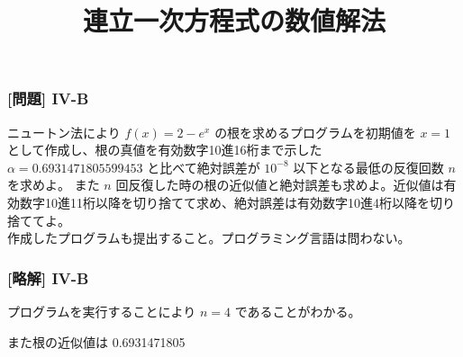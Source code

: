 \documentclass[dvipdfmx,aspectratio=169,20pt]{beamer}
\newcommand{\myfontsetting}[3]{{\fontsize{#1}{#2}\selectfont #3}}
\begin{document}
\begin{frame}
\frametitle{[問題] I\hspace{-.1em}V-B}
\myfontsetting{16pt}{18pt}{
ニュートン法により
}
\myfontsetting{14pt}{16pt}{
$f(x)=2-e^{x}$
}
\myfontsetting{16pt}{18pt}{
の根を求めるプログラムを初期値を $x=1$ として作成し、根の真値を有効数字10進16桁まで示した
}
\myfontsetting{14pt}{16pt}{
$\alpha=0.6931471805599453$
}
\myfontsetting{16pt}{18pt}{
と比べて絶対誤差が $10^{-8}$ 以下となる最低の反復回数 $n$ を求めよ。
また $n$ 回反復した時の根の近似値と絶対誤差も求めよ。近似値は有効数字10進11桁以降を切り捨てて求め、絶対誤差は有効数字10進4桁以降を切り捨ててよ。
}\\
\myfontsetting{12pt}{14pt}{
作成したプログラムも提出すること。プログラミング言語は問わない。
}
\end{frame}
\begin{frame}
\frametitle{[略解] I\hspace{-.1em}V-B}
\vspace{-0.5cm}
プログラムを実行することにより $n=4$ であることがわかる。
\vspace{0.5cm}

また根の近似値は 0.6931471805
\end{frame}

\title{{\Large 連立一次方程式の数値解法}}

\end{document}
